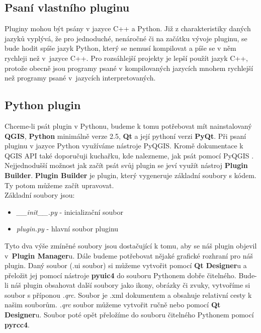 \subsection{Psaní vlastního pluginu}
Pluginy mohou být psány v jazyce C++ a Python. Již z charakteristiky daných jazyků vyplývá, že pro jednoduché, nenáročné či na začátku vývoje pluginu, se bude hodit spíše jazyk Python, který se nemusí kompilovat a píše se v něm rychleji než v~jazyce C++. Pro rozsáhlejší projekty je lepší použít jazyk C++, protože obecně jsou programy psané v kompilovaných jazycích mnohem rychlejší než programy psané v~jazycích interpretovaných. 

\subsection{Python plugin}
\nocite{pyqgis:www}
Chceme-li psát plugin v Pythonu, budeme k tomu potřebovat mít nainstalovaný \textbf{QGIS}, \textbf{Python} minimálně verze 2.5, \textbf{Qt} a její pythoní verzi \textbf{PyQt}. Při psaní pluginu v jazyce Python využíváme nástroje PyQGIS. Kromě dokumentace k QGIS API \cite{qgis_api:www} také doporučuji kuchařku, kde nalezneme, jak psát pomocí PyQGIS \cite{pyqgis:www}. Nejjednodušší možnost jak začít psát svůj plugin se jeví využít nástroj \textbf{Plugin Builder}. \textbf{Plugin Builder} je plugin, který vygeneruje základní soubory s kódem. Ty potom můžeme začít upravovat. \\

\noindent Základní soubory jsou:
\begin{itemize}
	\item \textit{\_\_init\_\_.py} - inicializační soubor
	\item \textit{plugin.py} - hlavní soubor pluginu
\end{itemize}

Tyto dva výše zmíněné soubory jsou dostačující k tomu, aby se náš plugin objevil v~\textbf{Plugin Manager}u. Dále budeme potřebovat nějaké grafické rozhraní pro náš plugin. Daný soubor (.ui soubor) si můžeme vytvořit pomocí \textbf{Qt Designer}u a přeložit jej pomocí nástroje  \textbf{pyuic4} do souboru Pythonem dobře čitelného. Bude-li náš plugin obsahovat další soubory jako ikony, obrázky či zvuky, vytvoříme si soubor s příponou \textit{.qrc}. Soubor je .xml dokumentem a obsahuje relativní cesty k našim souborům. \textit{.qrc} soubor můžeme vytvořit ručně nebo pomocí \textbf{Qt Designer}u. Soubor poté opět přeložíme do souboru čitelného Pythonem pomocí  \textbf{pyrcc4}.

